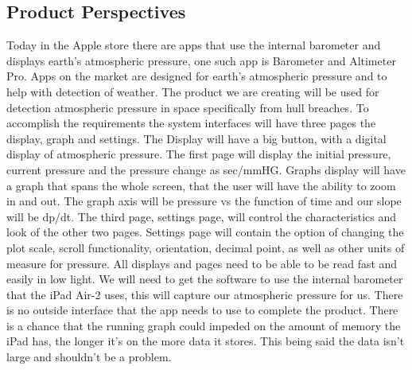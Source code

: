 \documentclass[onecolumn, draftclsnofoot,10pt, compsoc]{IEEEtran}
\begin{document}
\subsection{Product Perspectives}
Today in the Apple store there are apps that use the internal barometer and displays earth's atmospheric pressure, one such app is Barometer and Altimeter Pro.
Apps on the market are designed for earth's atmospheric pressure and to help with detection of weather.
The product we are creating will be used for detection atmospheric pressure in space specifically from hull breaches.
To accomplish the requirements the system interfaces will have three pages the display, graph and settings.
The Display will have a big button, with a digital display of atmospheric pressure.
The first page will display the initial pressure, current pressure and the pressure change as sec/mmHG.
Graphs display will have a graph that spans the whole screen, that the user will have the ability to zoom in and out.
 The graph axis will be pressure vs the function of time and our slope will be dp/dt.
 The third page, settings page, will control the characteristics and look of the other two pages.
Settings page will contain the option of changing the plot scale, scroll functionality, orientation, decimal point, as well as other units of measure for pressure.
 All displays and pages need to be able to be read fast and easily in low light.
We will need to get the software to use the internal barometer that the iPad Air-2 uses, this will capture our atmospheric pressure for us.
There is no outside interface that the app needs to use to complete the product.
There is a chance that the running graph could impeded on the amount of memory the iPad has, the longer it's on the more data it stores.
This being said the data isn't large and shouldn't be a problem.
\end{document}
